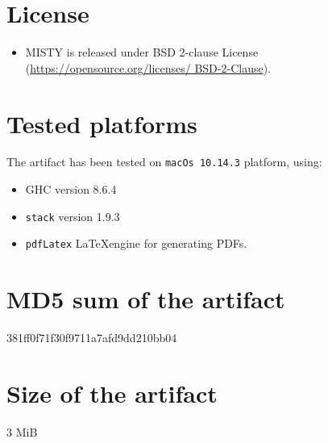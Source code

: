 \documentclass[a4paper,UKenglish]{darts-v2019}
\newenvironment{platforms}{\section{Tested platforms}}{}
\newcommand{\license}[1]{{\section{License}#1}}
\newcommand{\mdsum}[1]{{\section{MD5 sum of the artifact}#1}}
\newcommand{\artifactsize}[1]{{\section{Size of the artifact}#1}}
\newcommand{\misty}{\textsf{MISTY}\xspace}
\begin{document}
\license{
\begin{itemize}
\item \misty is released under BSD 2-clause License (\url{https://opensource.org/licenses/ BSD-2-Clause}).
\end{itemize}
}

\begin{platforms}
The artifact has been tested 
on \texttt{macOs 10.14.3} platform, using:
\begin{itemize}
\item GHC version 8.6.4 
\item \texttt{stack} version 1.9.3 
\item \texttt{pdfLatex} \LaTeX engine for generating 
PDFs. 
\end{itemize} 
\end{platforms}

\mdsum{381ff0f71f30f9711a7afd9dd210bb04}


\artifactsize{3 MiB}


\end{document}
